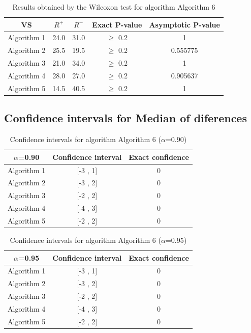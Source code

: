\documentclass[a4paper,10pt]{article}
\begin{document}
\begin{table}[!htp]
\centering\small
\begin{tabular}{
|c|c|c|c|c|}
\hline
 VS & $R^{+}$ & $R^{-}$ & Exact P-value & Asymptotic P-value \\ \hline 
Algorithm 1 & 24.0 & 31.0 & $\geq$ 0.2 & 1\\ \hline 
Algorithm 2 & 25.5 & 19.5 & $\geq$ 0.2 & 0.555775\\ \hline 
Algorithm 3 & 21.0 & 34.0 & $\geq$ 0.2 & 1\\ \hline 
Algorithm 4 & 28.0 & 27.0 & $\geq$ 0.2 & 0.905637\\ \hline 
Algorithm 5 & 14.5 & 40.5 & $\geq$ 0.2 & 1\\ \hline 

\end{tabular}
\caption{Results obtained by the Wilcoxon test for algorithm Algorithm 6}
\end{table}

\subsection{Confidence intervals for Median of diferences}

\begin{table}[!htp]
\centering\small
\begin{tabular}{
|c|c|c|}
\hline
 $\alpha$=0.90 & Confidence interval & Exact confidence \\ \hline 
Algorithm 1 & [-3 , 1] & 0\\ \hline 
Algorithm 2 & [-3 , 2] & 0\\ \hline 
Algorithm 3 & [-2 , 2] & 0\\ \hline 
Algorithm 4 & [-4 , 3] & 0\\ \hline 
Algorithm 5 & [-2 , 2] & 0\\ \hline 

\end{tabular}
\caption{Confidence intervals for algorithm Algorithm 6 ($\alpha$=0.90)}
\end{table}
\begin{table}[!htp]
\centering\small
\begin{tabular}{
|c|c|c|}
\hline
 $\alpha$=0.95 & Confidence interval & Exact confidence \\ \hline 
Algorithm 1 & [-3 , 1] & 0\\ \hline 
Algorithm 2 & [-3 , 2] & 0\\ \hline 
Algorithm 3 & [-2 , 2] & 0\\ \hline 
Algorithm 4 & [-4 , 3] & 0\\ \hline 
Algorithm 5 & [-2 , 2] & 0\\ \hline 

\end{tabular}
\caption{Confidence intervals for algorithm Algorithm 6 ($\alpha$=0.95)}
\end{table}

 \clearpage 
\end{document}
